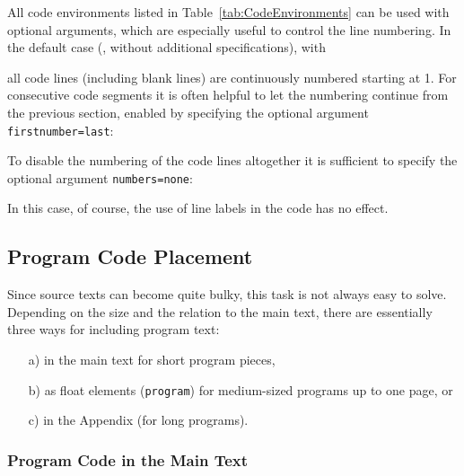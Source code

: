 All code environments listed in Table~\ref{tab:CodeEnvironments} can be used
with optional arguments, which are especially useful to control the line
numbering. In the default case (\ie, without additional specifications), with
%
%
all code lines (including blank lines) are continuously numbered starting at
1. For consecutive code segments it is often helpful to let the numbering
continue from the previous section, enabled by specifying the optional argument
\texttt{firstnumber={\obnh}last}:
%
%
To disable the numbering of the code lines altogether it is sufficient to
specify the optional argument
\texttt{numbers={\obnh}none}:
%
%
In this case, of course, the use of line labels in the code has no effect.


\subsection{Program Code Placement}

Since source texts can become quite bulky, this task is not always easy to
solve. Depending on the size and the relation to the main text, there are
essentially three ways for including program text:
%
\begin{itemize}
    \item[a)] in the main text for short program pieces,
    \item[b)] as float elements (\texttt{program}) for medium-sized programs
    up to one page, or
    \item[c)] in the Appendix (for long programs).
\end{itemize}


\subsubsection{Program Code in the Main Text}


